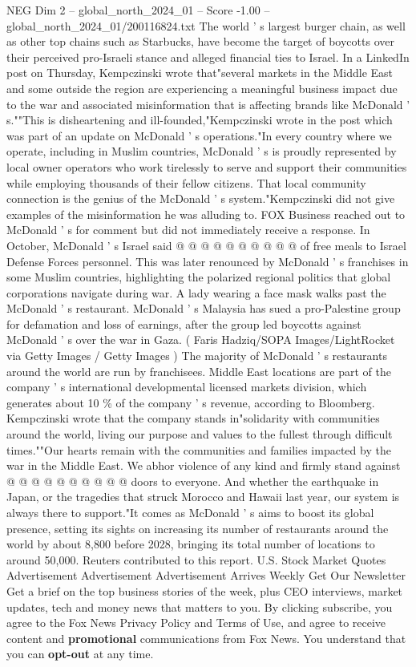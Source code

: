 \begin{textsample}{NEG Dim 2 – global\_north\_2024\_01 – Score -1.00 – global\_north\_2024\_01/200116824.txt}  \label{ex:f2_neg_239}
The world ' s largest burger chain, as well as other top chains such as Starbucks, have become the target of boycotts over their perceived pro-Israeli stance and alleged financial ties to Israel.
In a LinkedIn post on Thursday, Kempczinski wrote that"several markets in the Middle East and some outside the region are experiencing a meaningful business impact due to the war and associated misinformation that is affecting brands like McDonald ' s.""This is disheartening and ill-founded,"Kempczinski wrote in the post which was part of an update on McDonald ' s operations."In every country where we operate, including in Muslim countries, McDonald ' s is proudly represented by local owner operators who work tirelessly to serve and support their communities while employing thousands of their fellow citizens.
That local community connection is the genius of the McDonald ' s system."Kempczinski did not give examples of the misinformation he was alluding to.
FOX Business reached out to McDonald ' s for comment but did not immediately receive a response.
In October, McDonald ' s Israel said @ @ @ @ @ @ @ @ @ @ of free meals to Israel Defense Forces personnel.
This was later renounced by McDonald ' s franchises in some Muslim countries, highlighting the polarized regional politics that global corporations navigate during war.
A lady wearing a face mask walks past the McDonald ' s restaurant.
McDonald ' s Malaysia has sued a pro-Palestine group for defamation and loss of earnings, after the group led boycotts against McDonald ' s over the war in Gaza. ( Faris Hadziq/SOPA Images/LightRocket via Getty Images / Getty Images ) The majority of McDonald ' s restaurants around the world are run by franchisees.
Middle East locations are part of the company ' s international developmental licensed markets division, which generates about 10 \% of the company ' s revenue, according to Bloomberg.
Kempczinski wrote that the company stands in"solidarity with communities around the world, living our purpose and values to the fullest through difficult times.""Our hearts remain with the communities and families impacted by the war in the Middle East.
We abhor violence of any kind and firmly stand against @ @ @ @ @ @ @ @ @ @ doors to everyone.
And whether the earthquake in Japan, or the tragedies that struck Morocco and Hawaii last year, our system is always there to support."It comes as McDonald ' s aims to boost its global presence, setting its sights on increasing its number of restaurants around the world by about 8,800 before 2028, bringing its total number of locations to around 50,000.
Reuters contributed to this report.
U.S.
Stock Market Quotes Advertisement Advertisement Advertisement Arrives Weekly Get Our Newsletter Get a brief on the top business stories of the week, plus CEO interviews, market updates, tech and money news that matters to you.
By clicking subscribe, you agree to the Fox News Privacy Policy and Terms of Use, and agree to receive content and \textbf{promotional} communications from Fox News.
You understand that you can \textbf{opt-out} at any time.

\end{textsample}
